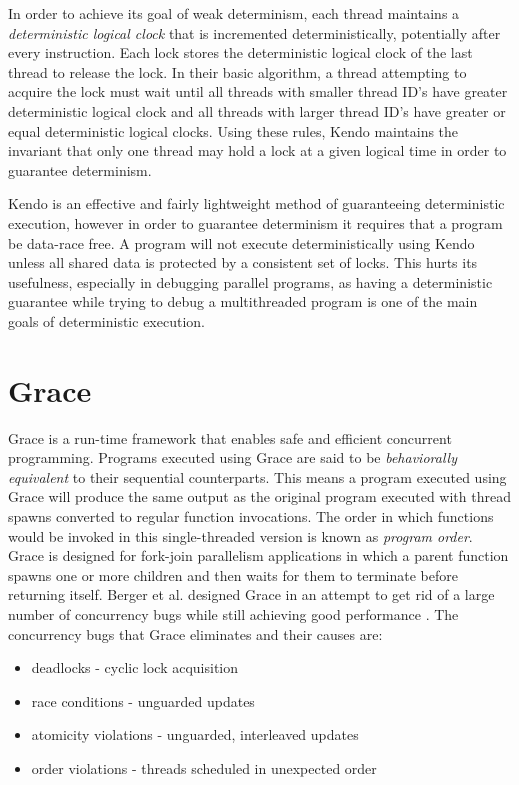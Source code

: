 In order to achieve its goal of weak determinism, each thread
maintains a \emph{deterministic logical clock} that is incremented
deterministically, potentially after every instruction.  Each lock
stores the deterministic logical clock of the last thread to release
the lock.  In their basic algorithm, a thread attempting to acquire
the lock must wait until all threads with smaller thread ID's have
greater deterministic logical clock and all threads with larger thread
ID's have greater or equal deterministic logical clocks.  Using these
rules, Kendo maintains the invariant that only one thread may hold a
lock at a given logical time in order to guarantee determinism.

Kendo is an effective and fairly lightweight method of guaranteeing
deterministic execution, however in order to guarantee determinism it
requires that a program be data-race free.  A program will not execute
deterministically using Kendo unless all shared data is protected by a
consistent set of locks.  This hurts its usefulness, especially in
debugging parallel programs, as having a deterministic guarantee while
trying to debug a multithreaded program is one of the main goals of
deterministic execution.

\section{Grace}

Grace is a run-time framework that enables safe and efficient
concurrent programming.  Programs executed using Grace are said to be
\emph{behaviorally equivalent} to their sequential counterparts.  This
means a program executed using Grace will produce the same output as
the original program executed with thread spawns converted to regular
function invocations.  The order in which functions would be invoked
in this single-threaded version is known as \emph{program order}.
Grace is designed for fork-join parallelism applications in which a
parent function spawns one or more children and then waits for them to
terminate before returning itself.  Berger et al. designed Grace in an
attempt to get rid of a large number of concurrency bugs while still
achieving good performance \cite{grace}.  The concurrency bugs that
Grace eliminates and their causes are:

\begin{itemize}
\item deadlocks - cyclic lock acquisition

\item race conditions - unguarded updates

\item atomicity violations - unguarded, interleaved updates

\item order violations - threads scheduled in unexpected order
\end{itemize}

